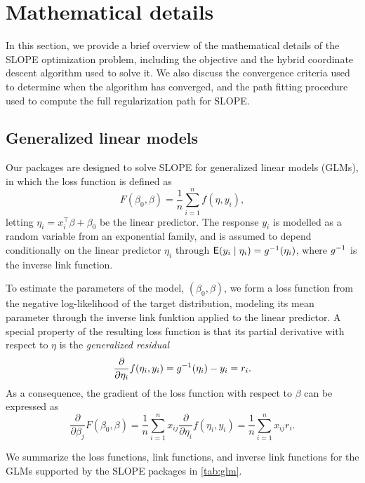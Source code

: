 \documentclass[article]{jss}
\begin{document}
\section{Mathematical details}\label{sec:math-details}

In this section, we provide a brief overview of the mathematical
details of the SLOPE optimization problem, including the objective and
the hybrid coordinate descent algorithm used to solve it. We also discuss the
convergence criteria used to determine when the algorithm has converged, and
the path fitting procedure used to compute the full regularization path for SLOPE.

\subsection{Generalized linear models}

Our packages are designed to solve SLOPE for generalized linear models (GLMs),
in which the loss function is defined as
\[
  F(\beta_0, \beta) = \frac{1}{n} \sum_{i=1}^n f(\eta, y_i),
\]
letting \(\eta_i = x_i^\intercal \beta + \beta_0\) be the linear predictor. The
response \(y_i\) is modelled as a random variable from an exponential family,
and is assumed to depend conditionally on the linear predictor \(\eta_i\)
through \(\mathsf{E}(y_i \mid \eta_i) = g^{-1}(\eta_i)\), where \(g^{-1}\) is the
inverse link function.

To estimate the parameters of the model, \((\beta_0, \beta)\), we form a loss
function from the negative log-likelihood of the target distribution, modeling
its mean parameter through the inverse link funktion applied to the linear
predictor. A special property of the resulting loss function is that its partial
derivative with respect to \(\eta\) is the
\emph{generalized residual}
\[
  \frac{\partial}{\partial \eta_i} f(\eta_i, y_i) = g^{-1}(\eta_i) - y_i = r_i.
\]
As a consequence, the gradient of the loss function with respect to \(\beta\)
can be expressed as
\[
  \frac{\partial}{\partial \beta_j} F(\beta_0,\beta)
  = \frac{1}{n} \sum_{i=1}^n x_{ij} \frac{\partial}{\partial \eta_i} f(\eta_i, y_i)
  = \frac{1}{n} \sum_{i=1}^n x_{ij} r_i.
\]

We summarize the loss functions, link functions, and inverse link functions
for the GLMs supported by the SLOPE packages in \autoref{tab:glm}.
\end{document}
